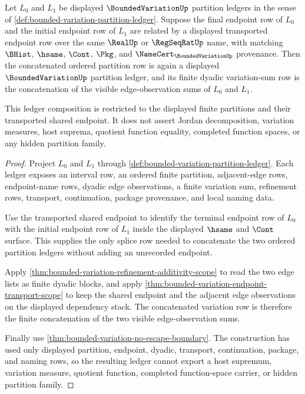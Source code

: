 \begin{theorem}
\label{thm:bounded-variation-partition-concatenation-ledger}
Let $L_0$ and $L_1$ be displayed $\BoundedVariationUp$ partition ledgers in the sense of \autoref{def:bounded-variation-partition-ledger}. Suppose the final endpoint row of $L_0$ and the initial endpoint row of $L_1$ are related by a displayed transported endpoint row over the same $\RealUp$ or $\RegSeqRatUp$ name, with matching $\BHist$, $\hsame$, $\Cont$, $\Pkg$, and $\NameCert_{\BoundedVariationUp}$ provenance. Then the concatenated ordered partition row is again a displayed $\BoundedVariationUp$ partition ledger, and its finite dyadic variation-sum row is the concatenation of the visible edge-observation sums of $L_0$ and $L_1$.

This ledger composition is restricted to the displayed finite partitions and their transported shared endpoint. It does not assert Jordan decomposition, variation measures, host suprema, quotient function equality, completed function spaces, or any hidden partition family.
\end{theorem}
\begin{proof}
Project $L_0$ and $L_1$ through \autoref{def:bounded-variation-partition-ledger}. Each ledger exposes an interval row, an ordered finite partition, adjacent-edge rows, endpoint-name rows, dyadic edge observations, a finite variation sum, refinement rows, transport, continuation, package provenance, and local naming data.

Use the transported shared endpoint to identify the terminal endpoint row of $L_0$ with the initial endpoint row of $L_1$ inside the displayed $\hsame$ and $\Cont$ surface. This supplies the only splice row needed to concatenate the two ordered partition ledgers without adding an unrecorded endpoint.

Apply \autoref{thm:bounded-variation-refinement-additivity-scope} to read the two edge lists as finite dyadic blocks, and apply \autoref{thm:bounded-variation-endpoint-transport-scope} to keep the shared endpoint and the adjacent edge observations on the displayed dependency stack. The concatenated variation row is therefore the finite concatenation of the two visible edge-observation sums.

Finally use \autoref{thm:bounded-variation-no-escape-boundary}. The construction has used only displayed partition, endpoint, dyadic, transport, continuation, package, and naming rows, so the resulting ledger cannot export a host supremum, variation measure, quotient function, completed function-space carrier, or hidden partition family.
\end{proof}

